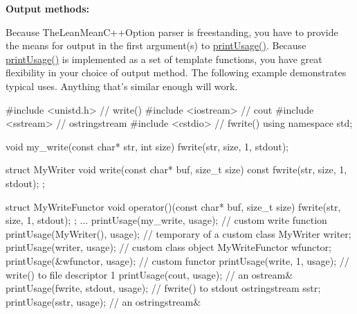 {\bfseries \-Output methods\-:}

\-Because \-The\-Lean\-Mean\-C++\-Option parser is freestanding, you have to provide the means for output in the first argument(s) to \hyperlink{namespaceoption_afc8bb7e040a98a0b33ff1ce9da1be0d1}{print\-Usage()}. \-Because \hyperlink{namespaceoption_afc8bb7e040a98a0b33ff1ce9da1be0d1}{print\-Usage()} is implemented as a set of template functions, you have great flexibility in your choice of output method. \-The following example demonstrates typical uses. \-Anything that's similar enough will work.


\begin{DoxyCode}
 #include <unistd.h>  // write()
 #include <iostream>  // cout
 #include <sstream>   // ostringstream
 #include <cstdio>    // fwrite()
 using namespace std;

 void my_write(const char* str, int size) {
   fwrite(str, size, 1, stdout);
 }

 struct MyWriter {
   void write(const char* buf, size_t size) const {
      fwrite(str, size, 1, stdout);
   }
 };

 struct MyWriteFunctor {
   void operator()(const char* buf, size_t size) {
      fwrite(str, size, 1, stdout);
   }
 };
 ...
 printUsage(my_write, usage);    // custom write function
 printUsage(MyWriter(), usage);  // temporary of a custom class
 MyWriter writer;
 printUsage(writer, usage);      // custom class object
 MyWriteFunctor wfunctor;
 printUsage(&wfunctor, usage);   // custom functor
 printUsage(write, 1, usage);    // write() to file descriptor 1
 printUsage(cout, usage);        // an ostream&
 printUsage(fwrite, stdout, usage);  // fwrite() to stdout
 ostringstream sstr;
 printUsage(sstr, usage);        // an ostringstream&
\end{DoxyCode}


